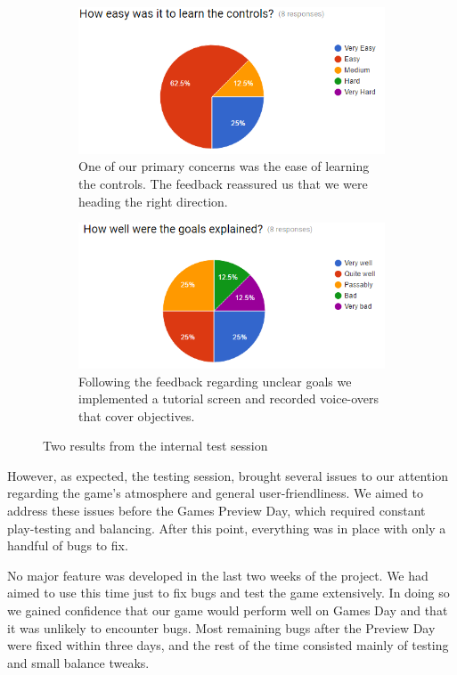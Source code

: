 \documentclass[a4paper,11pt]{article}
\begin{document}
\begin{figure}[ht]
	\centering
    \begin{subfigure}[b]{0.45\textwidth}
    	\centering
    	\includegraphics[scale=0.45]{control_feedback}
    	\caption{One of our primary concerns was the ease of learning the controls. The feedback reassured us that we were heading the right direction.}
    \end{subfigure}
    \begin{subfigure}[b]{0.45\textwidth}
    	\centering
    	\includegraphics[scale=0.45]{goal_feedback}
    	\caption{Following the feedback regarding unclear goals we implemented a tutorial screen and recorded voice-overs that cover objectives.}
    \end{subfigure}
    \caption{Two results from the internal test session}
    \label{fig:feedback_form}
\end{figure}

However, as expected, the testing session, brought several issues to our attention regarding the game’s atmosphere and general user-friendliness. We aimed to address these issues before the Games Preview Day, which required constant play-testing and balancing. After this point, everything was in place with only a handful of bugs to fix.

No major feature was developed in the last two weeks of the project. We had aimed to use this time just to fix bugs and test the game extensively. In doing so we gained confidence that our game would perform well on Games Day and that it was unlikely to encounter bugs. Most remaining bugs after the Preview Day were fixed within three days, and the rest of the time consisted mainly of testing and small balance tweaks.
\end{document}

